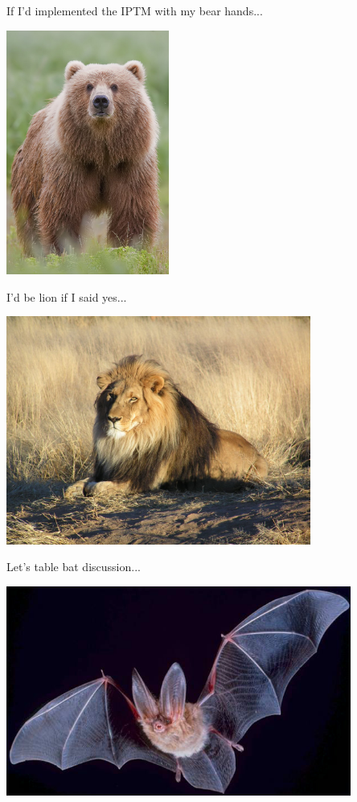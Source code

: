 \documentclass[10pt, xcolor=table]{beamer}
\theoremstyle{definition}
\theoremstyle{remark}
\begin{document}
\begin{frame}{If I'd implemented the IPTM with my bear hands...}
  \begin{center}
\includegraphics[width=0.4\textwidth]{figures/bear}
\end{center}
\end{frame}

\begin{frame}{I'd be lion if I said yes...}
  \begin{center}
\includegraphics[width=0.75\textwidth]{figures/lion}
\end{center}
\end{frame}

\begin{frame}{Let's table bat discussion...}
  \begin{center}
\includegraphics[width=0.85\textwidth]{figures/bat}
\end{center}
\end{frame}
\end{document}
